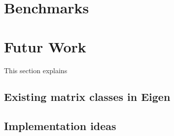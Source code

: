 \documentclass[a4wide]{scrartcl}
\begin{document}
\section{Benchmarks}
\section{Futur Work}
This section explains 
\subsection{Existing matrix classes in Eigen}
\subsection{Implementation ideas}
\end{document}
